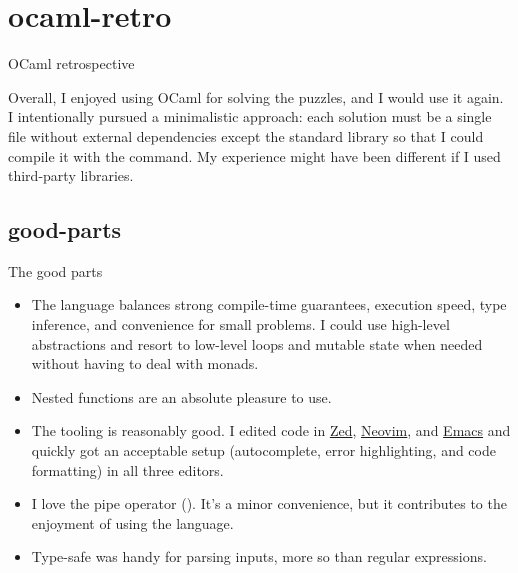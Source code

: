 \documentclass{article}
\begin{document}
\section{ocaml-retro}{OCaml retrospective}

Overall, I enjoyed using OCaml for solving the puzzles, and I would use it again.
I intentionally pursued a minimalistic approach: each solution must be a single file without external dependencies except the standard library so that I could compile it with the  command.
My experience might have been different if I used third-party libraries.

\subsection{good-parts}{The good parts}
\begin{itemize}
\item
  The language balances strong compile-time guarantees, execution speed, type inference, and convenience for small problems.
  I could use high-level abstractions and resort to low-level loops and mutable state when needed without having to deal with monads.
\item
  Nested functions are an absolute pleasure to use.
\item
  The tooling is reasonably good.
  I edited code in \href{https://zed.dev/}{Zed}, \href{https://neovim.io/}{Neovim}, and \href{https://www.gnu.org/software/emacs/}{Emacs} and quickly got an acceptable setup (autocomplete, error highlighting, and code formatting) in all three editors.
\item
  I love the pipe operator (\href{https://ocaml.org/manual/5.2/api/Stdlib.html#VAL(%7C%3E)}{\code{|>}}).
  It’s a minor convenience, but it contributes to the enjoyment of using the language.
\item
  Type-safe \href{https://ocaml.org/manual/5.2/api/Scanf.html#VALscanf}{} was handy for parsing inputs, more so than regular expressions.
\end{itemize}
\end{document}
